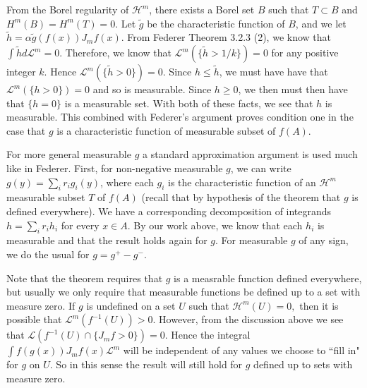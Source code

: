 From the Borel regularity of \(\mathcal H^m\), there exists a Borel set \(B\) such that \(T \subset B\) and \(H^m(B) = H^m(T) = 0\). Let \(\tilde g\) be the characteristic function of \(B\), and
we let \(\tilde h = \alpha \tilde g\left(f(x)\right) J_m f(x)\). From Federer Theorem 3.2.3 (2), we know that \(\int \tilde h d \mathcal L^m = 0\). Therefore, we know that 
\(\mathcal L^m \left( \{ \tilde h > 1/k \} \right) = 0\) for any positive integer \(k\). Hence \(\mathcal L^m \left( \{ \tilde h > 0 \} \right) = 0\). Since \(h \leq \tilde h\), we must have
have that \(\mathcal L^m\left( \{h > 0\} \right) = 0\) and so is measurable. Since \(h \geq 0\), we then must then have that \(\{h = 0\}\) is a measurable set. With both of these facts, we see
that \(h\) is measurable. This combined with Federer's argument proves condition one in the case that \(g\) is a characteristic function of measurable subset of \(f(A)\).

For more general measurable \(g\) a standard approximation argument is used much like in Federer. First, for non-negative measurable \(g\), we can write \(g(y) = \sum_i r_i g_i(y)\), where
each \(g_i\) is the characteristic function of an \(\mathcal H^m\) measurable subset \(T\) of \(f(A)\) (recall that by hypothesis of the theorem that \(g\) is defined everywhere).
We have a corresponding decomposition of integrands \(h = \sum_i r_i h_i\) for every \(x \in A\). By our work above, we know that each \(h_i\) is measurable and that the result holds again
for \(g\). For measurable \(g\) of any sign, we do the usual for \(g = g^+ - g^-\). 

Note that the theorem requires that \(g\) is a measrable function defined everywhere, but usually we only require that measurable functions be defined up to a set with measure zero. If \(g\)
is undefined on a set \(U\) such that \(\mathcal H^m(U) = 0,\) then it is possible that \(\mathcal L^m\left(f^{-1}(U)\right) > 0\). However, from the discussion above we see that
\(\mathcal L \left(f^{-1}(U) \cap \{J_m f > 0\}\right) = 0\). Hence the integral \(\int f(g(x)) J_m f(x) \mathcal L^m\) will be independent of any values we choose to ``fill in" for \(g\) on \(U\). So
in this sense the result will still hold for \(g\) defined up to sets with measure zero.

